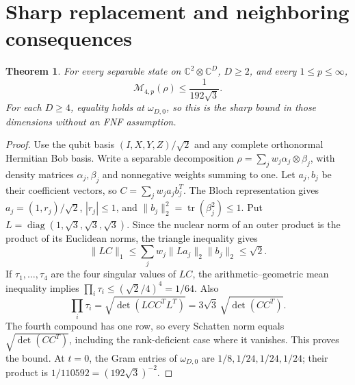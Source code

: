 \documentclass[11pt]{article}
\newtheorem{theorem}{Theorem}
\newcommand{\tr}{\operatorname{tr}}
\newcommand{\CM}{\mathcal M}
\begin{document}
\section{Sharp replacement and neighboring consequences}

\begin{theorem}\label{thm:sharp}
For every separable state on $\mathbb C^2\otimes\mathbb C^D$, $D\ge2$,
and every $1\le p\le\infty$,
\[
 \CM_{4,p}(\rho)\le\frac1{192\sqrt3}.
\]
For each $D\ge4$, equality holds at $\omega_{D,0}$, so this is the
sharp bound in those dimensions without an FNF assumption.
\end{theorem}
\begin{proof}
Use the qubit basis $(I,X,Y,Z)/\sqrt2$ and any complete orthonormal
Hermitian Bob basis. Write a separable decomposition
$\rho=\sum_jw_j\alpha_j\otimes\beta_j$, with density matrices
$\alpha_j,\beta_j$ and nonnegative weights summing to one.
Let $a_j,b_j$ be their coefficient vectors, so $C=\sum_jw_ja_jb_j^T$.
The Bloch representation gives $a_j=(1,r_j)/\sqrt2$, $|r_j|\le1$,
and $\|b_j\|_2^2=\tr(\beta_j^2)\le1$.
Put $L=\operatorname{diag}(1,\sqrt3,\sqrt3,\sqrt3)$.
Since the nuclear norm of an outer product is the product of its
Euclidean norms, the triangle inequality gives
\[
 \|LC\|_1\le\sum_jw_j\|La_j\|_2\|b_j\|_2\le\sqrt2.
\]
If $\tau_1,\ldots,\tau_4$ are the four singular values of $LC$,
the arithmetic--geometric mean inequality implies
$\prod_i\tau_i\le(\sqrt2/4)^4=1/64$.
Also
\[
 \prod_i\tau_i=\sqrt{\det(LCC^TL^T)}
 =3\sqrt3\,\sqrt{\det(CC^T)}.
\]
The fourth compound has one row, so every Schatten norm equals
$\sqrt{\det(CC^T)}$, including the rank-deficient case where it vanishes.
This proves the bound. At $t=0$, the Gram entries of $\omega_{D,0}$ are
$1/8,1/24,1/24,1/24$; their product is $1/110592=(192\sqrt3)^{-2}$.
\end{proof}
\end{document}
